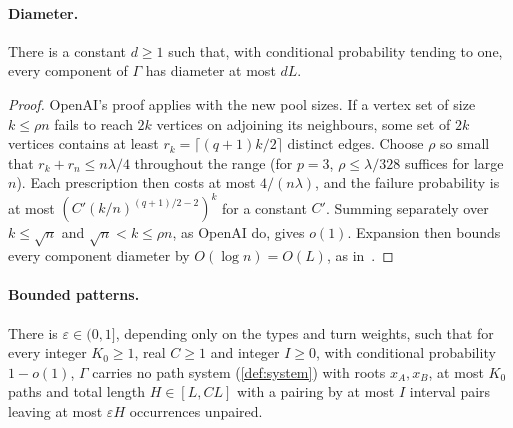 \documentclass[11pt]{article}
\theoremstyle{definition}
\theoremstyle{plain}
\newcommand{\eps}{\varepsilon}
\begin{document}
\paragraph{Diameter.}

\begin{lemma}\label{lem:diameter}
There is a constant $d\ge1$ such that, with conditional probability tending to one, every component of $\Gamma$ has diameter at most $dL$.
\end{lemma}

\begin{proof}
OpenAI's proof applies with the new pool sizes. If a vertex set of size $k\le\rho n$ fails to reach $2k$ vertices on adjoining its neighbours, some set of $2k$ vertices contains at least $r_k=\lceil(q+1)k/2\rceil$ distinct edges. Choose $\rho$ so small that $r_k+r_n\le n\lambda/4$ throughout the range (for $p=3$, $\rho\le\lambda/328$ suffices for large $n$). Each prescription then costs at most $4/(n\lambda)$, and the failure probability is at most $(C'(k/n)^{(q+1)/2-2})^k$ for a constant $C'$. Summing separately over $k\le\sqrt n$ and $\sqrt n<k\le\rho n$, as OpenAI do, gives $o(1)$. Expansion then bounds every component diameter by $O(\log n)=O(L)$, as in~\cite[Lemma~2.3]{OAI196}.
\end{proof}

\paragraph{Bounded patterns.}

\begin{proposition}\label{prop:patterns}
There is $\eps\in(0,1]$, depending only on the types and turn weights, such that for every integer $K_0\ge1$, real $C\ge1$ and integer $I\ge0$, with conditional probability $1-o(1)$, $\Gamma$ carries no path system (\cref{def:system}) with roots $x_A,x_B$, at most $K_0$ paths and total length $H\in[L,CL]$ with a pairing by at most $I$ interval pairs leaving at most $\eps H$ occurrences unpaired.
\end{proposition}
\end{document}

